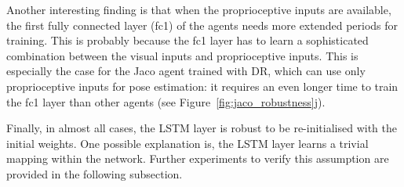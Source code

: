 Another interesting finding is that when the proprioceptive inputs are available, the first fully connected layer (fc1) of the agents needs more extended periods for training. This is probably because the fc1 layer has to learn a sophisticated combination between the visual inputs and proprioceptive inputs. This is especially the case for the Jaco agent trained with DR, which can use only proprioceptive inputs for pose estimation: it requires an even longer time to train the fc1 layer than other agents (see Figure~\ref{fig:jaco_robustness}j).

Finally, in almost all cases, the LSTM layer is robust to be re-initialised with the initial weights. One possible explanation is, the LSTM layer learns a trivial mapping within the network. Further experiments to verify this assumption are provided in the following subsection.

